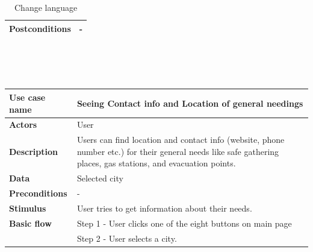 \begin{center}
\begin{table}[H]
\begin{tabular}{| m{3cm}| m{10cm} |}
            \hline
            \textbf{Postconditions}   & -                                                                                                                         \\
            \hline
        \end{tabular}
        \caption[Change language]{Change language}
    \end{table}
    ~\\~\\~\\
    \begin{table}[H]
        \begin{tabular}{| m{3cm}| m{10cm} |}
            \hline
            \textbf{Use case name}    & Seeing Contact info and Location of general needings                                                                                                           \\
            \hline
            \textbf{Actors}           & User                                                                                                                                                           \\
            \hline
            \textbf{Description}      & Users can find location and contact info (website, phone number etc.) for their general needs like safe gathering places, gas stations, and evacuation points. \\
            \hline
            \textbf{Data}             & Selected city                                                                                                                                                  \\
            \hline
            \textbf{Preconditions}    & -                                                                                                                                                              \\
            \hline
            \textbf{Stimulus}         & User tries to get information about their needs.                                                                                                               \\
            \hline
            \textbf{Basic flow}       & Step 1 - User clicks one of the eight buttons on main page                                                                                                     \\
                                      & Step 2 - User selects a city.                                                                                                                                  \\

\end{tabular}
\end{table}
\end{center}
